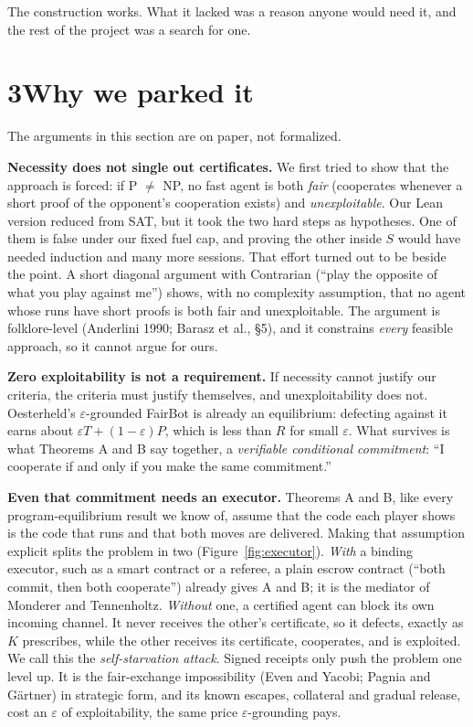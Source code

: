 \documentclass[11pt]{article}
\begin{document}
The construction works. What it lacked was a reason anyone would need it, and the rest of the project was a search for one.

\section*{3\quad Why we parked it}

The arguments in this section are on paper, not formalized.

\textbf{Necessity does not single out certificates.} We first tried to show that the approach is forced: if P $\neq$ NP, no fast agent is both \emph{fair} (cooperates whenever a short proof of the opponent's cooperation exists) and \emph{unexploitable}. Our Lean version reduced from SAT, but it took the two hard steps as hypotheses. One of them is false under our fixed fuel cap, and proving the other inside $S$ would have needed induction and many more sessions. That effort turned out to be beside the point. A short diagonal argument with Contrarian (``play the opposite of what you play against me'') shows, with no complexity assumption, that no agent whose runs have short proofs is both fair and unexploitable. The argument is folklore-level (Anderlini 1990; Barasz et al., \S5), and it constrains \emph{every} feasible approach, so it cannot argue for ours.

\textbf{Zero exploitability is not a requirement.} If necessity cannot justify our criteria, the criteria must justify themselves, and unexploitability does not. Oesterheld's $\varepsilon$-grounded FairBot is already an equilibrium: defecting against it earns about $\varepsilon T + (1-\varepsilon)P$, which is less than $R$ for small $\varepsilon$. What survives is what Theorems A and B say together, a \emph{verifiable conditional commitment}: ``I cooperate if and only if you make the same commitment.''

\textbf{Even that commitment needs an executor.} Theorems A and B, like every program-equilibrium result we know of, assume that the code each player shows is the code that runs and that both moves are delivered. Making that assumption explicit splits the problem in two (Figure~\ref{fig:executor}). \emph{With} a binding executor, such as a smart contract or a referee, a plain escrow contract (``both commit, then both cooperate'') already gives A and B; it is the mediator of Monderer and Tennenholtz. \emph{Without} one, a certified agent can block its own incoming channel. It never receives the other's certificate, so it defects, exactly as $K$ prescribes, while the other receives its certificate, cooperates, and is exploited. We call this the \emph{self-starvation attack}. Signed receipts only push the problem one level up. It is the fair-exchange impossibility (Even and Yacobi; Pagnia and Gärtner) in strategic form, and its known escapes, collateral and gradual release, cost an $\varepsilon$ of exploitability, the same price $\varepsilon$-grounding pays.
\end{document}
